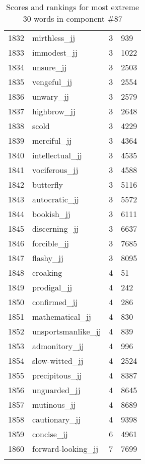 \begin{longtable}[!htbp]{| rlr@{.}l |}
    1832 & mirthless\_jj & 3 & 939 \\
    1833 & immodest\_jj & 3 & 1022 \\
    1834 & unsure\_jj & 3 & 2503 \\
    1835 & vengeful\_jj & 3 & 2554 \\
    1836 & unwary\_jj & 3 & 2579 \\
    1837 & highbrow\_jj & 3 & 2648 \\
    1838 & scold & 3 & 4229 \\
    1839 & merciful\_jj & 3 & 4364 \\
    1840 & intellectual\_jj & 3 & 4535 \\
    1841 & vociferous\_jj & 3 & 4588 \\
    1842 & butterfly & 3 & 5116 \\
    1843 & autocratic\_jj & 3 & 5572 \\
    1844 & bookish\_jj & 3 & 6111 \\
    1845 & discerning\_jj & 3 & 6637 \\
    1846 & forcible\_jj & 3 & 7685 \\
    1847 & flashy\_jj & 3 & 8095 \\
    1848 & croaking & 4 & 51 \\
    1849 & prodigal\_jj & 4 & 242 \\
    1850 & confirmed\_jj & 4 & 286 \\
    1851 & mathematical\_jj & 4 & 830 \\
    1852 & unsportsmanlike\_jj & 4 & 839 \\
    1853 & admonitory\_jj & 4 & 996 \\
    1854 & slow-witted\_jj & 4 & 2524 \\
    1855 & precipitous\_jj & 4 & 8387 \\
    1856 & unguarded\_jj & 4 & 8645 \\
    1857 & mutinous\_jj & 4 & 8689 \\
    1858 & cautionary\_jj & 4 & 9398 \\
    1859 & concise\_jj & 6 & 4961 \\
    1860 & forward-looking\_jj & 7 & 7699 \\
    \hline
    \caption{Scores and rankings for most extreme 30 words in component \#87} \\
\end{longtable}
